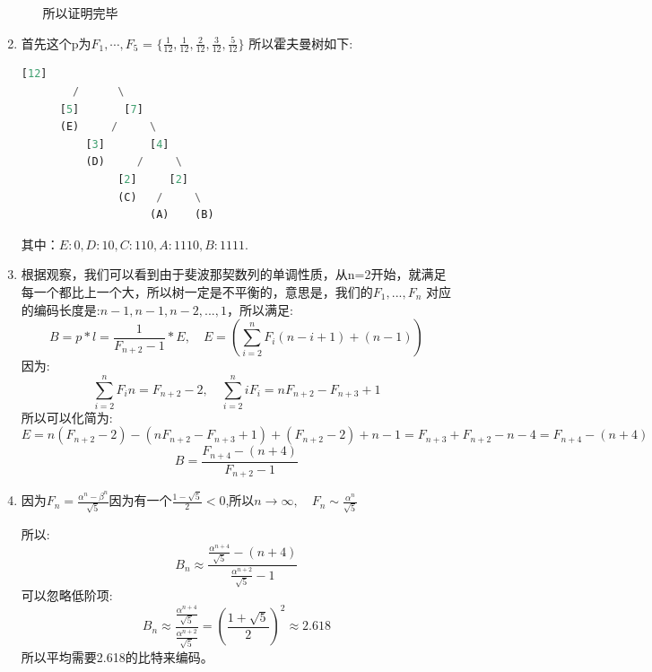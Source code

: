 \documentclass[answers]{exam}  %
\begin{document}
\begin{enumerate}[label=\alph*.]
\begin{itemize}
\[        \]
        所以证明完毕
    \end{itemize}
    \item 首先这个p为$F_1,\cdots,F_5$ = $\{\frac{1}{12}, \frac{1}{12}, \frac{2}{12},\frac{3}{12}, \frac{5}{12}\}$
    所以霍夫曼树如下:
    \begin{lstlisting}[language=python]
          [12]
        /      \
      [5]       [7]
      (E)     /     \
          [3]       [4]
          (D)     /     \
               [2]     [2]
               (C)   /     \
                    (A)    (B)
    \end{lstlisting}
    其中：$E: 0, D: 10, C: 110, A: 1110, B: 1111$.
    \item 根据观察，我们可以看到由于斐波那契数列的单调性质，从n=2开始，就满足每一个都比上一个大，所以树一定是不平衡的，意思是，我们的$F_1,...,F_n$ 对应的编码长度是:$n-1,n-1,n-2,...,1$，所以满足:
    \[
        B = p*l = \frac{1}{F_{n+2} -1}*E, \quad E = (\sum_{i=2}^{n} F_i(n-i+1) + (n-1))
    \]
    因为:
    \[
        \sum_{i=2}^{n} F_i n = F_{n+2} - 2, \quad \sum_{i=2}^{n} iF_i = nF_{n+2} - F_{n+3} + 1
    \]
    所以可以化简为:
    \[
        E = n(F_{n+2} - 2) - (nF_{n+2} -F_{n+3} + 1) + (F_{n+2} - 2) + n-1 = F_{n+3} + F_{n+2} -n -4 = F_{n+4} - (n+4)
    \]
    \[
        B = \frac{F_{n+4} - (n+4)}{F_{n+2} -1}
    \]
    \item 因为$F_n = \frac{\alpha^n - \beta^n}{\sqrt{5}}$因为有一个$\frac{1-\sqrt{5}}{2} < 0$,所以$n\rightarrow \infty, \quad F_n \sim \frac{\alpha^n}{\sqrt{5}}$
    
    所以:
    \[
        B_n \approx \frac{\frac{\alpha^{n+4}}{\sqrt{5}} - (n+4)}{ \frac{\alpha^{n+2}}{\sqrt{5}} - 1}
    \]
    可以忽略低阶项:
    \[
        B_n \approx \frac{\frac{\alpha^{n+4}}{\sqrt{5}} }{ \frac{\alpha^{n+2}}{\sqrt{5}}} = (\frac{1 + \sqrt{5}}{2})^2 \approx 2.618
    \]
    所以平均需要2.618的比特来编码。
\end{enumerate}
\end{document}
